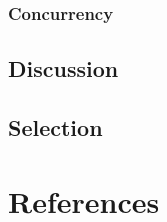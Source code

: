 \documentclass[10pt,letterpaper,onecolumn,draftclsnofoot]{IEEEtran}
\begin{document}
\subsubsection{Concurrency}

\subsection{Discussion}

\subsection{Selection}



\section{References}



\end{document}
